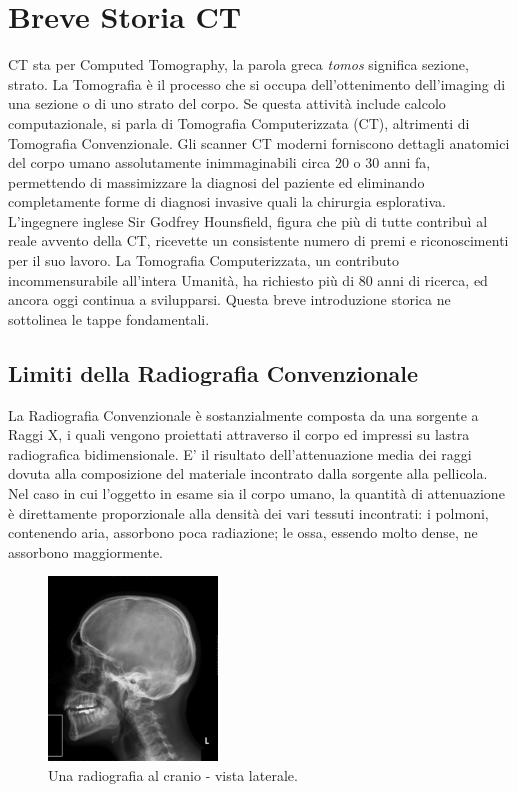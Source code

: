 \documentclass[a4paper,12pt, doubleside]{report}
\begin{document}
        \section{Breve Storia CT}
            \par
                CT sta per Computed Tomography, la parola greca \textit{tomos} significa sezione, strato. La Tomografia è il processo che si occupa dell'ottenimento dell'imaging di una sezione o di uno strato del corpo. Se questa attività include calcolo computazionale, si parla di Tomografia Computerizzata (CT), altrimenti di Tomografia Convenzionale.
                Gli scanner CT moderni forniscono dettagli anatomici del corpo umano assolutamente inimmaginabili circa 20 o 30 anni fa, permettendo di massimizzare la diagnosi del paziente ed eliminando completamente forme di diagnosi invasive quali la chirurgia esplorativa. L'ingegnere inglese Sir Godfrey Hounsfield, figura che più di tutte contribuì al reale avvento della CT, ricevette un consistente numero di premi e riconoscimenti per il suo lavoro. La Tomografia Computerizzata, un contributo incommensurabile all’intera Umanità, ha richiesto più di 80 anni di ricerca, ed ancora oggi continua a svilupparsi. Questa breve introduzione storica ne sottolinea le tappe fondamentali.
            
            \subsection{Limiti della Radiografia Convenzionale}
                \par
                    La Radiografia Convenzionale è sostanzialmente composta da una sorgente a Raggi X, i quali vengono proiettati attraverso il corpo ed impressi su lastra radiografica bidimensionale. E' il risultato dell’attenuazione media \cite{hounsfield-nobel-lecture} dei raggi dovuta alla composizione del materiale incontrato dalla sorgente alla pellicola. Nel caso in cui l’oggetto in esame sia il corpo umano, la quantità di attenuazione è direttamente proporzionale alla densità dei vari tessuti incontrati: i polmoni, contenendo aria, assorbono poca radiazione; le ossa, essendo molto dense, ne assorbono maggiormente.
                            
                    \begin{figure}[h]
                        \centering
                        \includegraphics[width=0.4\textwidth]{radiografia}
                        \caption{Una radiografia al cranio - vista laterale.}
                        \label{fig:skull}
                    \end{figure}
                        
\end{document}
